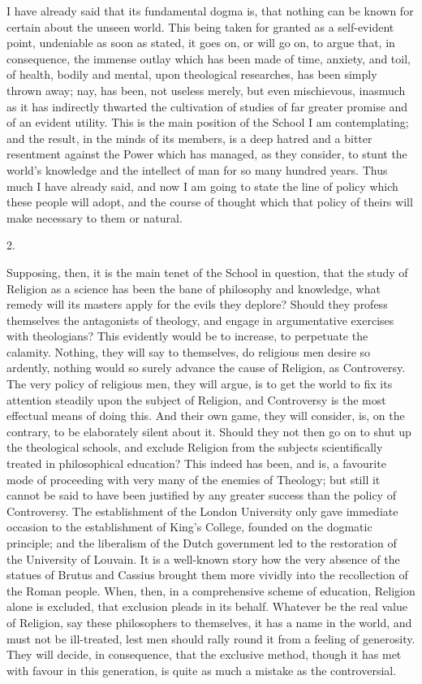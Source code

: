 I have already said that its fundamental dogma is, that nothing can
be known for certain about the unseen world. This being taken for
granted as a self-evident point, undeniable as soon as stated, it goes
on, or will go on, to argue that, in consequence, the immense outlay
which has been made of time, anxiety, and toil, of health, bodily and
mental, upon theological researches, has been simply thrown
away; nay, has been, not useless merely, but even mischievous,
inasmuch as it has indirectly thwarted the cultivation of studies of
far greater promise and of an evident utility. This is the main
position of the School I am contemplating; and the result, in the
minds of its members, is a deep hatred and a bitter resentment against
the Power which has managed, as they consider, to stunt the world's
knowledge and the intellect of man for so many hundred years. Thus
much I have already said, and now I am going to state the line of
policy which these people will adopt, and the course of thought which
that policy of theirs will make necessary to them or natural.

2.

Supposing, then, it is the main tenet of the School in question,
that the study of Religion as a science has been the bane of
philosophy and knowledge, what remedy will its masters apply for the
evils they deplore? Should they profess themselves the antagonists of
theology, and engage in argumentative exercises with theologians? This
evidently would be to increase, to perpetuate the calamity. Nothing,
they will say to themselves, do religious men desire so ardently,
nothing would so surely advance the cause of Religion, as Controversy.
The very policy of religious men, they will argue, is to get the world
to fix its attention steadily upon the subject of Religion, and
Controversy is the most effectual means of doing this. And their own
game, they will consider, is, on the contrary, to be elaborately
silent about it. Should they not then go on to shut up the theological
schools, and exclude Religion from the subjects scientifically treated
in philosophical education? This indeed has been, and is, a favourite
mode of proceeding with very many of the enemies of Theology;
but still it cannot be said to have been justified by any greater
success than the policy of Controversy. The establishment of the
London University only gave immediate occasion to the establishment of
King's College, founded on the dogmatic principle; and the liberalism
of the Dutch government led to the restoration of the University of
Louvain. It is a well-known story how the very absence of the statues
of Brutus and Cassius brought them more vividly into the recollection
of the Roman people. When, then, in a comprehensive scheme of
education, Religion alone is excluded, that exclusion pleads in its
behalf. Whatever be the real value of Religion, say these philosophers
to themselves, it has a name in the world, and must not be
ill-treated, lest men should rally round it from a feeling of
generosity. They will decide, in consequence, that the exclusive
method, though it has met with favour in this generation, is quite as
much a mistake as the controversial.

